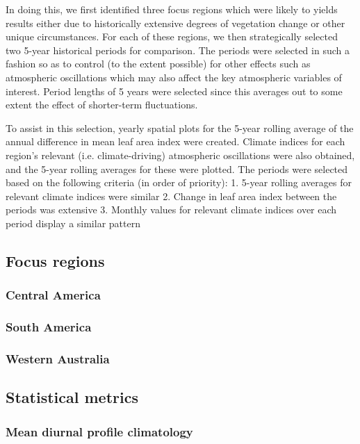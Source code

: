 In doing this, we first identified three focus regions which were likely to yields results either due to historically extensive degrees of vegetation change or other unique circumstances. For each of these regions, we then strategically selected two 5-year historical periods for comparison. The periods were selected in such a fashion so as to control (to the extent possible) for other effects such as atmospheric oscillations which may also affect the key atmospheric variables of interest. Period lengths of 5 years were selected since this averages out to some extent the effect of shorter-term fluctuations.

To assist in this selection, yearly spatial plots for the 5-year rolling average of the annual difference in mean leaf area index were created. Climate indices for each region's relevant (i.e. climate-driving) atmospheric oscillations were also obtained, and the 5-year rolling averages for these were plotted. The periods were selected based on the following criteria (in order of priority):
1. 5-year rolling averages for relevant climate indices were similar
2. Change in leaf area index between the periods was extensive
3. Monthly values for relevant climate indices over each period display a similar pattern 

\subsection{Focus regions}

\subsubsection{Central America}

\subsubsection{South America}

\subsubsection{Western Australia}

\subsection{Statistical metrics}

\subsubsection{Mean diurnal profile climatology}

